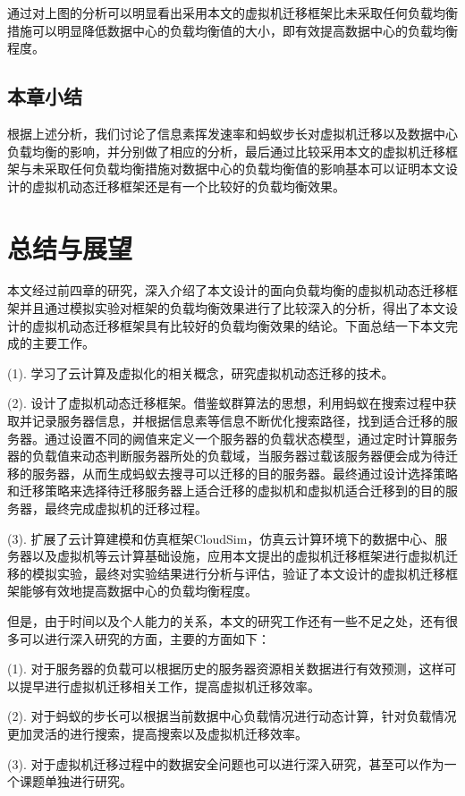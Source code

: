 通过对上图的分析可以明显看出采用本文的虚拟机迁移框架比未采取任何负载均衡措施可以明显降低数据中心的负载均衡值的大小，即有效提高数据中心的负载均衡程度。

 \section{本章小结}
根据上述分析，我们讨论了信息素挥发速率和蚂蚁步长对虚拟机迁移以及数据中心负载均衡的影响，并分别做了相应的分析，最后通过比较采用本文的虚拟机迁移框架与未采取任何负载均衡措施对数据中心的负载均衡值的影响基本可以证明本文设计的虚拟机动态迁移框架还是有一个比较好的负载均衡效果。

\chapter{总结与展望}
本文经过前四章的研究，深入介绍了本文设计的面向负载均衡的虚拟机动态迁移框架并且通过模拟实验对框架的负载均衡效果进行了比较深入的分析，得出了本文设计的虚拟机动态迁移框架具有比较好的负载均衡效果的结论。下面总结一下本文完成的主要工作。

    (1). 学习了云计算及虚拟化的相关概念，研究虚拟机动态迁移的技术。
    
    (2). 设计了虚拟机动态迁移框架。借鉴蚁群算法的思想，利用蚂蚁在搜索过程中获取并记录服务器信息，并根据信息素等信息不断优化搜索路径，找到适合迁移的服务器。通过设置不同的阙值来定义一个服务器的负载状态模型，通过定时计算服务器的负载值来动态判断服务器所处的负载域，当服务器过载该服务器便会成为待迁移的服务器，从而生成蚂蚁去搜寻可以迁移的目的服务器。最终通过设计选择策略和迁移策略来选择待迁移服务器上适合迁移的虚拟机和虚拟机适合迁移到的目的服务器，最终完成虚拟机的迁移过程。

    (3). 扩展了云计算建模和仿真框架CloudSim，仿真云计算环境下的数据中心、服务器以及虚拟机等云计算基础设施，应用本文提出的虚拟机迁移框架进行虚拟机迁移的模拟实验，最终对实验结果进行分析与评估，验证了本文设计的虚拟机迁移框架能够有效地提高数据中心的负载均衡程度。

但是，由于时间以及个人能力的关系，本文的研究工作还有一些不足之处，还有很多可以进行深入研究的方面，主要的方面如下：

    (1). 对于服务器的负载可以根据历史的服务器资源相关数据进行有效预测，这样可以提早进行虚拟机迁移相关工作，提高虚拟机迁移效率。

    (2). 对于蚂蚁的步长可以根据当前数据中心负载情况进行动态计算，针对负载情况更加灵活的进行搜索，提高搜索以及虚拟机迁移效率。
    
    (3). 对于虚拟机迁移过程中的数据安全问题也可以进行深入研究，甚至可以作为一个课题单独进行研究。




























